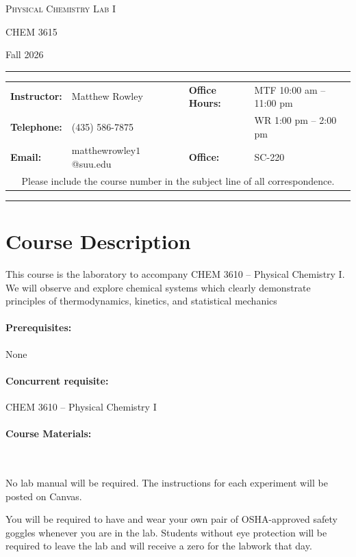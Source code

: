 \documentclass[12pt, letterpaper]{article}
\begin{document}
\begin{center}
	{\Large \textsc{Physical Chemistry Lab I}}

	CHEM 3615
\end{center}

\begin{center}
	{\large Fall 2026}
\end{center}
\begin{center}
	\rule{0.99\textwidth}{0.4pt}
	\begin{tabular}{llcll}
		\textbf{Instructor:} & Matthew Rowley           &  & \textbf{Office Hours:} & MTF 10:00 am -- 11:00 pm \\
		\textbf{Telephone:}  & (435) 586-7875           &  &                        & WR 1:00 pm -- 2:00 pm    \\
		\textbf{Email:}      & matthewrowley$1$@suu.edu &  & \textbf{Office:}       & SC-220                   \\
		\multicolumn{5}{c}{Please include the course number in the subject line of all correspondence.}
	\end{tabular}
	\rule{0.99\textwidth}{0.4pt}
\end{center}

\section*{Course Description}
This course is the laboratory to accompany CHEM 3610 -- Physical Chemistry I. We will observe and explore chemical systems which clearly demonstrate principles of thermodynamics, kinetics, and statistical mechanics

\paragraph{Prerequisites:}
None

\paragraph{Concurrent requisite:}
CHEM 3610 -- Physical Chemistry I

\paragraph{Course Materials:} ~

\noindent No lab manual will be required. The instructions for each experiment will be posted on Canvas.

\noindent You will be required to have and wear your own pair of OSHA-approved safety goggles whenever you are in the lab. Students without eye protection will be required to leave the lab and will receive a zero for the labwork that day.
\end{document}
